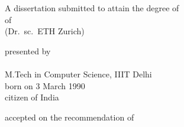 \begin{titlepage}
    \begin{center}
        \large
        \begingroup
        \endgroup

        \hfill

        \vfill

        \begingroup
            \spacedallcaps{\myTitle}
        \endgroup

        \vfill

        \begingroup
            A dissertation submitted to attain the degree of\\
            \vspace{0.5em}
            of
             \\
            (Dr.\ sc.\ ETH Zurich)
        \endgroup

        \vfill

        \begingroup
            presented by\\
            \vspace{0.5em}
            \spacedlowsmallcaps{\myName}\\
            M.Tech in Computer Science, IIIT Delhi \\
            \vspace{0.5em}
            born on 3 March 1990\\
            citizen of India
        \endgroup

        \vfill

        \begingroup
            accepted on the recommendation of\\
            \vspace{0.5em}
        \endgroup

        \vfill

        \myTime%

        \vfill
    \end{center}
\end{titlepage}
